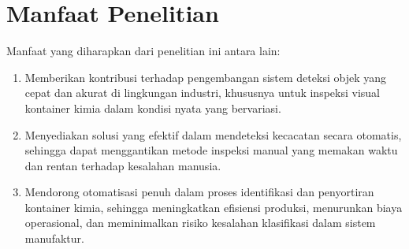\vspace{1em}

\section{Manfaat Penelitian}
\noindent
Manfaat yang diharapkan dari penelitian ini antara lain:
\begin{enumerate}
  \item Memberikan kontribusi terhadap pengembangan sistem deteksi
    objek yang cepat dan akurat di lingkungan industri, khususnya
    untuk inspeksi visual kontainer kimia dalam kondisi nyata yang bervariasi.
  \item Menyediakan solusi yang efektif dalam mendeteksi kecacatan secara
    otomatis, sehingga dapat menggantikan metode inspeksi manual yang
    memakan waktu dan rentan terhadap kesalahan manusia.
  \item Mendorong otomatisasi penuh dalam proses identifikasi dan
    penyortiran kontainer kimia, sehingga meningkatkan efisiensi
    produksi, menurunkan biaya operasional, dan meminimalkan risiko
    kesalahan klasifikasi dalam sistem manufaktur.
\end{enumerate}

